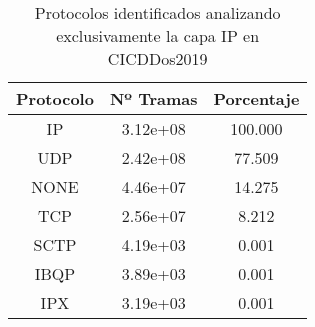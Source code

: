 \begin{table}[H]
    \begin{center}
        \begin{tabular}{|c | c c|} 
            \hline
            \textbf{Protocolo} & \textbf{Nº Tramas} & \textbf{Porcentaje}\\
            \hline\hline
IP & 3.12e+08 & 100.000 \\
UDP & 2.42e+08 & 77.509 \\
NONE & 4.46e+07 & 14.275 \\
TCP & 2.56e+07 & 8.212 \\
SCTP & 4.19e+03 & 0.001 \\
IBQP & 3.89e+03 & 0.001 \\
IPX & 3.19e+03 & 0.001 \\
            \hline
        \end{tabular}
    \end{center}
    \caption{Protocolos identificados analizando exclusivamente la capa IP en CICDDos2019}
    \label{table:cicddos2019protocolsip}
\end{table}
